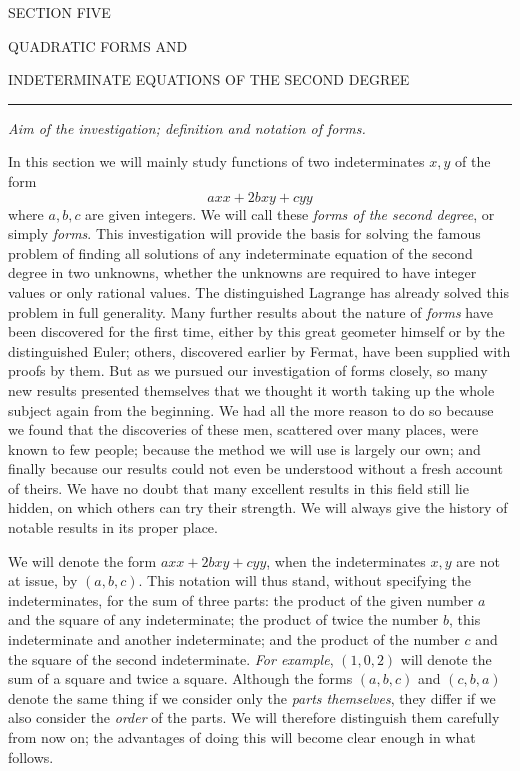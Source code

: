 \begin{center}
SECTION FIVE

QUADRATIC FORMS AND

INDETERMINATE EQUATIONS OF THE SECOND DEGREE
\end{center}
\begin{center}\rule{.35\linewidth}{.4pt}\end{center}

\begin{center}
\textit{Aim of the investigation; definition and notation of forms.}
\end{center}

In this section we will mainly study functions of two indeterminates $x,y$ of the form
\[
axx+2bxy+cyy
\]
where $a,b,c$ are given integers. We will call these \textit{forms of the second degree}, or simply \textit{forms}. This investigation will provide the basis for solving the famous problem of finding all solutions of any indeterminate equation of the second degree in two unknowns, whether the unknowns are required to have integer values or only rational values. The distinguished Lagrange has already solved this problem in full generality. Many further results about the nature of \textit{forms} have been discovered for the first time, either by this great geometer himself or by the distinguished Euler; others, discovered earlier by Fermat, have been supplied with proofs by them. But as we pursued our investigation of forms closely, so many new results presented themselves that we thought it worth taking up the whole subject again from the beginning. We had all the more reason to do so because we found that the discoveries of these men, scattered over many places, were known to few people; because the method we will use is largely our own; and finally
because our results could not even be understood without a fresh account of theirs. We have no doubt that many excellent results in this field still lie hidden, on which others can try their strength. We will always give the history of notable results in its proper place.

We will denote the form $axx+2bxy+cyy$, when the indeterminates $x,y$ are not at issue, by $(a,b,c)$. This notation will thus stand, without specifying the indeterminates, for the sum of three parts: the product of the given number $a$ and the square of any indeterminate; the product of twice the number $b$, this indeterminate and another indeterminate; and the product of the number $c$ and the square of the second indeterminate. \textit{For example}, $(1,0,2)$ will denote the sum of a square and twice a square. Although the forms $(a,b,c)$ and $(c,b,a)$ denote the same thing if we consider only the \textit{parts themselves}, they differ if we also consider the \textit{order} of the parts. We will therefore distinguish them carefully from now on; the advantages of doing this will become clear enough in what follows.


